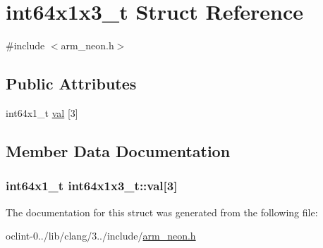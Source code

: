\hypertarget{structint64x1x3__t}{\section{int64x1x3\-\_\-t Struct Reference}
\label{structint64x1x3__t}
}


{\ttfamily \#include $<$arm\-\_\-neon.\-h$>$}

\subsection*{Public Attributes}
\begin{DoxyCompactItemize}
\item 
int64x1\-\_\-t \hyperlink{structint64x1x3__t_a47b2e53efc1324b30a817dba419ad824}{val} \mbox{[}3\mbox{]}
\end{DoxyCompactItemize}


\subsection{Member Data Documentation}
\hypertarget{structint64x1x3__t_a47b2e53efc1324b30a817dba419ad824}{
\subsubsection[{val}]{\setlength{\rightskip}{0pt plus 5cm}int64x1\-\_\-t int64x1x3\-\_\-t\-::val\mbox{[}3\mbox{]}}}\label{structint64x1x3__t_a47b2e53efc1324b30a817dba419ad824}


The documentation for this struct was generated from the following file\-:\begin{DoxyCompactItemize}
\item 
oclint-\/0../lib/clang/3../include/\hyperlink{arm__neon_8h}{arm\-\_\-neon.\-h}\end{DoxyCompactItemize}
